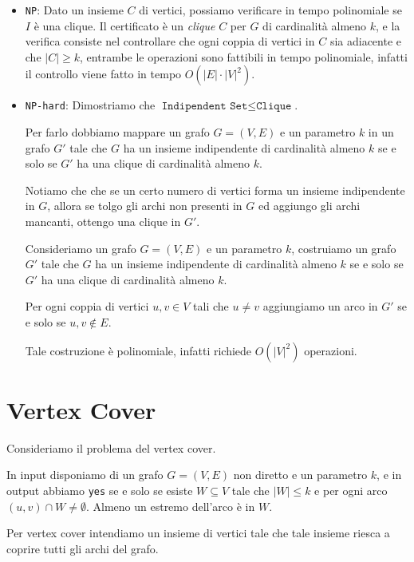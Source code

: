 \begin{itemize}
    \item \texttt{NP}: Dato un insieme $C$ di vertici, possiamo verificare in tempo polinomiale
    se $I$ è una clique. Il certificato è un \textit{clique} $C$ per $G$ di cardinalità almeno $k$,
    e la verifica consiste nel controllare che ogni coppia di vertici in $C$ sia adiacente e che
    $|C| \geq k$, entrambe le operazioni sono fattibili in tempo polinomiale, infatti il controllo
    viene fatto in tempo $O(|E| \cdot |V|^2)$.
    \item \texttt{NP-hard}: Dimostriamo che $\texttt{Indipendent Set} \leq \texttt{Clique}$.
    
    Per farlo dobbiamo mappare un grafo $G = (V,E)$ e un parametro $k$ in un grafo $G'$ tale che
    $G$ ha un insieme indipendente di cardinalità almeno $k$ se e solo se $G'$ ha una clique di
    cardinalità almeno $k$.

    Notiamo che che se un certo numero di vertici forma un insieme indipendente in $G$, allora
    se tolgo gli archi non presenti in $G$ ed aggiungo gli archi mancanti, ottengo una clique in $G'$.

    Consideriamo un grafo $G = (V,E)$ e un parametro $k$, costruiamo un grafo $G'$ tale che
    $G$ ha un insieme indipendente di cardinalità almeno $k$ se e solo se $G'$ ha una clique di
    cardinalità almeno $k$.

    Per ogni coppia di vertici $u,v \in V$ tali che $u \neq v$ aggiungiamo un arco in $G'$ se e solo
    se $u,v \notin E$.

    Tale costruzione è polinomiale, infatti richiede $O(|V|^2)$ operazioni.
\end{itemize}

\section{Vertex Cover}
Consideriamo il problema del vertex cover.

In input disponiamo di un grafo $G = (V,E)$ non diretto e un parametro $k$, e in output abbiamo
\texttt{yes} se e solo se esiste $W \subseteq V$ tale che $|W| \leq k$ e per ogni arco $(u,v) \cap W 
\neq \emptyset$. Almeno un estremo dell'arco è in $W$.

Per vertex cover intendiamo un insieme di vertici tale che tale insieme riesca a coprire tutti gli
archi del grafo.

